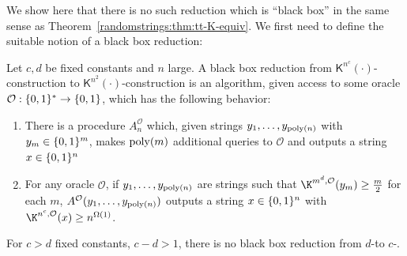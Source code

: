 We show here that there is no such reduction which is ``black box'' in the same sense as Theorem~\ref{randomstrings:thm:tt-K-equiv}. We first need to define the suitable notion of a black box reduction:
\begin{definition}
Let $c,d$ be fixed constants and $n$ large. A black box reduction from $\mathsf{K}^{n^c}(\cdot) $-construction to $\mathsf{K}^{n^2}(\cdot)$-construction is an algorithm, given access to some oracle $\mathcal{O}: \{0,1\}^* \to \{0,1\}$, which has the following behavior:
\begin{enumerate}
    \item 
    There is a procedure $A^{\mathcal{O}}_n$ which, given strings $y_1,\ldots,y_{\mathrm{poly}(n)}$ with $y_m \in \{0,1\}^m$, makes $\mathrm{poly}(m)$ additional queries to $\mathcal{O}$ and outputs a string $x \in \{0,1\}^n$
    \item For any oracle $\mathcal{O}$, if $y_1,\ldots,y_{\mathrm{poly}(n)}$ are strings such that $\K^{m^d, \mathcal{O}}(y_m) \geq \frac{m}{2}$ for each $m$, $A^{\mathcal{O}}(y_1,\ldots,y_{\mathrm{poly}(n)})$ outputs a string $x \in \{0,1\}^n$ with $\K^{n^c, \mathcal{O}}(x) \geq n^{\Omega(1)}$.
\end{enumerate}
\end{definition}
\begin{theorem}
For $c>d$ fixed constants, $c-d> 1$, there is no black box reduction from $d$-\avoid to $c$-\avoid.
\end{theorem}
